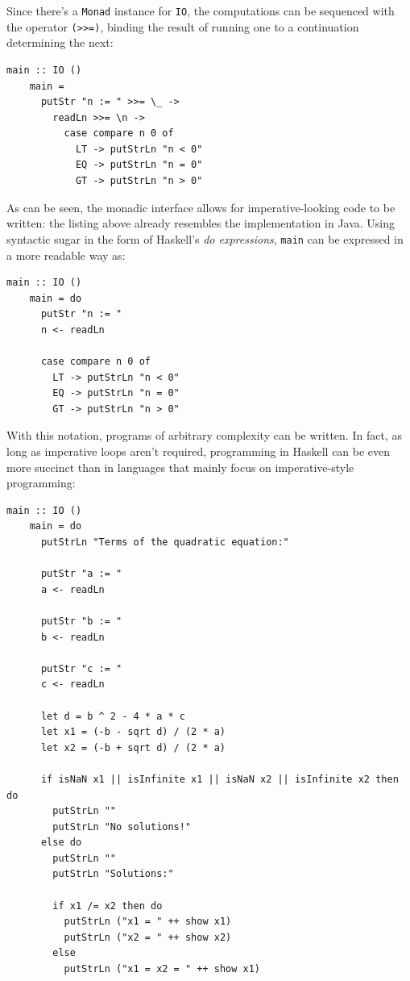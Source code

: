 \documentclass[UdineBachThesis,american,11pt]{PhdThesis}
\begin{document}
  Since there's a \mbox{\texttt{Monad}} instance for \mbox{\texttt{IO}}, the
  computations can be sequenced with the operator \mbox{\texttt{(>>=)}}, binding
  the result of running one to a continuation determining the next:

  \begin{Verbatim}[gobble=4,fontsize=\small]
    main :: IO ()
    main =
      putStr "n := " >>= \_ ->
        readLn >>= \n ->
          case compare n 0 of
            LT -> putStrLn "n < 0"
            EQ -> putStrLn "n = 0"
            GT -> putStrLn "n > 0"
  \end{Verbatim}

  As can be seen, the monadic interface allows for imperative-looking code to be
  written: the listing above already resembles the implementation in Java. Using
  syntactic sugar in the form of Haskell's \emph{do expressions},
  \mbox{\texttt{main}} can be expressed in a more readable way as:

  \begin{Verbatim}[gobble=4,fontsize=\small]
    main :: IO ()
    main = do
      putStr "n := "
      n <- readLn

      case compare n 0 of
        LT -> putStrLn "n < 0"
        EQ -> putStrLn "n = 0"
        GT -> putStrLn "n > 0"
  \end{Verbatim}

  With this notation, programs of arbitrary complexity can be written. In fact,
  as long as imperative loops aren't required, programming in Haskell can be
  even more succinct than in languages that mainly focus on imperative-style
  programming:

  \begin{Verbatim}[gobble=4,fontsize=\small]
    main :: IO ()
    main = do
      putStrLn "Terms of the quadratic equation:"

      putStr "a := "
      a <- readLn

      putStr "b := "
      b <- readLn

      putStr "c := "
      c <- readLn

      let d = b ^ 2 - 4 * a * c
      let x1 = (-b - sqrt d) / (2 * a)
      let x2 = (-b + sqrt d) / (2 * a)

      if isNaN x1 || isInfinite x1 || isNaN x2 || isInfinite x2 then do
        putStrLn ""
        putStrLn "No solutions!"
      else do
        putStrLn ""
        putStrLn "Solutions:"

        if x1 /= x2 then do
          putStrLn ("x1 = " ++ show x1)
          putStrLn ("x2 = " ++ show x2)
        else
          putStrLn ("x1 = x2 = " ++ show x1)
  \end{Verbatim}
\end{document}
